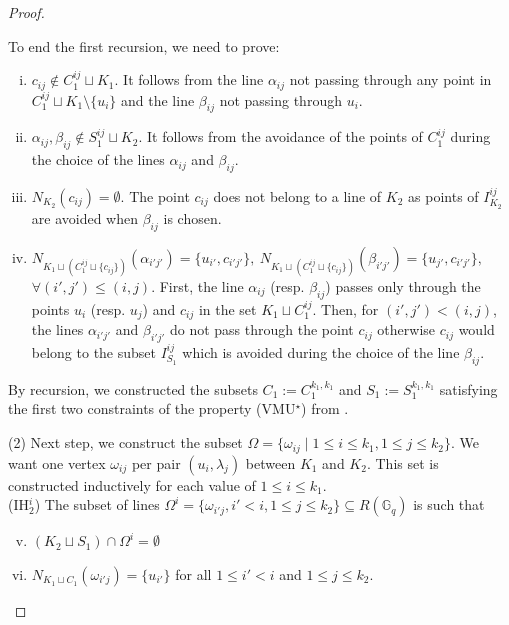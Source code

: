 \documentclass[10pt,a4paper]{article}
\newcommand{\ls}{\leqslant}
\newcommand{\G}[1][q]{\mathbb{G}_{#1}}
\begin{document}
\begin{proof}
\begin{itemize}
        \end{itemize}
        To end the first recursion, we need to prove:
        \begin{enumerate}[(i)]
            \item $c_{ij} \notin C_1^{ij} \sqcup K_1$. It follows from the line $\alpha_{ij}$ not passing through any point in $C_1^{ij} \sqcup K_1 \setminus \{u_i\}$ and the line $\beta_{ij}$ not passing through $u_i$. 
            \item $\alpha_{ij},\beta_{ij} \notin S_1^{ij} \sqcup K_2$. It follows from the avoidance of the points of $C_1^{ij}$ during the choice of the lines $\alpha_{ij}$ and $\beta_{ij}$.
            \item $N_{K_2}(c_{ij}) = \emptyset $. The point $c_{ij}$ does not belong to a line of $K_2$ as points of $I_{K_2}^{ij}$ are avoided when $\beta_{ij}$ is chosen.
            \item  $N_{K_1 \sqcup (C_1^{ij}\sqcup \{c_{ij}\})}(\alpha_{i'j'}) = \{u_{i'}, c_{i'j'}\},\ N_{K_1 \sqcup (C_1^{ij}\sqcup \{c_{ij}\})}(\beta_{i'j'}) = \{u_{j'}, c_{i'j'}\},$ \\$\forall (i', j')\ls(i,j)$. First, the line $\alpha_{ij}$ (resp. $\beta_{ij}$) passes only through the points $u_i$ (resp. $u_j$) and $c_{ij}$ in  the set $K_1 \sqcup C_1^{ij}$. Then,  for $(i', j') < (i,j)$, the lines $\alpha_{i'j'}$ and $\beta_{i'j'}$ do not pass through the point $c_{ij}$ otherwise $c_{ij}$ would belong to the subset $I_{S_1}^{ij}$ which is avoided during the choice of the line $\beta_{ij}$. 
        \end{enumerate}
        By recursion, we constructed the subsets $C_1 := C_1^{k_1, k_1}$ and $S_1 := S_1^{k_1, k_1}$ satisfying the first two constraints of the property (VMU$^\star$) from .
        
        \bigskip (2) Next step, we construct the subset $\Omega = \{\omega_{ij}\mid 1 \ls i \ls k_1, 1 \ls j \ls k_2\}$. We want one vertex $\omega_{ij}$ per pair $(u_i, \lambda_j)$ between $K_1$ and $K_2$. This set is constructed inductively for each value of $1 \ls i \ls k_1$. \\

        (IH$_2^{i}$) The subset of lines $\Omega^i = \{\omega_{i'j}, i' < i, 1 \ls j \ls k_2\} \subseteq R(\G)$ is such that         
        \begin{enumerate}[(i)]
            \setcounter{enumi}{4}
            \item $ (K_2 \sqcup S_1)\cap \Omega^i= \emptyset$
            \item $N_{K_1 \sqcup C_1}(\omega_{i'j}) = \{u_{i'}\}$ for all $1 \ls i' < i$ and $1 \ls j \ls k_2$.
        \end{enumerate}
        

\end{proof}
\end{document}

